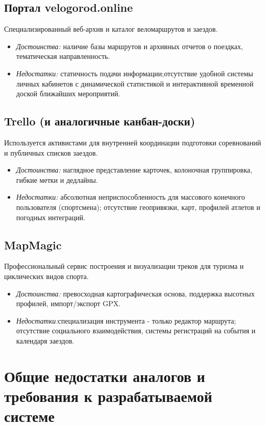 \documentclass[oneside,a4paper,14pt]{extarticle}
\begin{document}
\subsection{Портал velogorod.online}
Специализированный веб-архив и каталог веломаршрутов и заездов.
\begin{itemize}
	\item \textit{Достоинства:} наличие базы маршрутов и архивных отчетов о поездках, тематическая направленность.
	\item \textit{Недостатки:} статичность подачи информации;отсутствие удобной системы личных кабинетов с динамической статистикой и интерактивной временной доской ближайших мероприятий.
\end{itemize}

\newpage

\subsection{Trello (и аналогичные канбан-доски)}
Используется активистами для внутренней координации подготовки соревнований и публичных списков заездов.
\begin{itemize}
	\item \textit{Достоинства:} наглядное представление карточек, колоночная группировка, гибкие метки и дедлайны.
	\item \textit{Недостатки:} абсолютная неприспособленность для массового конечного пользователя (спортсмена); отсутствие геопривязки, карт, профилей атлетов и погодных интеграций.
\end{itemize}

\subsection{MapMagic}
Профессиональный сервис построения и визуализации треков для туризма и циклических видов спорта.
\begin{itemize}
	\item \textit{Достоинства:} превосходная картографическая основа, поддержка высотных профилей, импорт/экспорт GPX.
	\item \textit{Недостатки:}специализация инструмента - только редактор маршрута; отсутствие социального взаимодействия, системы регистраций на события и календаря заездов.
\end{itemize}

\newpage
\section{Общие недостатки аналогов и требования к разрабатываемой системе}
\end{document}
